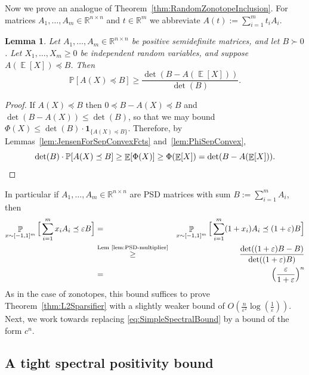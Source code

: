 \documentclass[12pt,english]{article}
\theoremstyle{theorem}
\newtheorem{lemma}[theorem]{Lemma}
\theoremstyle{remark}
\providecommand{\setR}{\mathbb{R}}
\newcommand{\E}{\mathop{\mathbb{E}}}
\renewcommand{\Pr}{\mathop{\mathbb{P}}}
\begin{document}
Now we prove an analogue of Theorem~\ref{thm:RandomZonotopeInclusion}.
For matrices  $A_1,\dots,A_m\in\mathbb R^{n\times n}$ and $t \in \setR^m$ we abbreviate $A(t) := \sum_{i=1}^m t_iA_i$.
\begin{lemma} \label{lem:PSD-multiplier}
Let $A_1,\dots,A_m\in\mathbb R^{n\times n}$ be positive semidefinite matrices,
and let $B\succ0$. 
Let $X_1,\dots,X_m\geq0$ be independent random variables, and suppose $A(\E[X])\preceq B$. Then
\[
        \mathbb{P}[A(X)\preceq B] \ge \frac{\det(B-A(\E[X]))}{\det(B)}.
\]
\end{lemma}
\begin{proof}
If $A(X)\preceq B$ then $0\preceq B-A(X)\preceq B$ and $\det(B-A(X))\leq\det(B)$, so that we may bound $\Phi(X) \le \det(B)\cdot \mathbf 1_{\{A(X)\preceq B\}}$. Therefore, by Lemmas~\ref{lem:JensenForSepConvexFcts} and~\ref{lem:PhiSepConvex},
\[
        \det(B)\cdot \mathbb P[A(X)\preceq B] \ge \E[\Phi(X)] \ge \Phi(\E[X]) = \det(B-A(\E[X])). \qedhere
\]
\end{proof}
In particular if $A_1,\ldots,A_m \in \setR^{n \times n}$ are PSD matrices with sum $B := \sum_{i=1}^m A_i$, then
\begin{eqnarray} 
  \Pr_{x \sim [-1,1]^m}\Big[ \sum_{i=1}^m x_iA_i \preceq \varepsilon B\Big] &=& \Pr_{x \sim [-1,1]^m}\Big[ \sum_{i=1}^m (1+x_i)A_i \preceq (1+\varepsilon) B\Big] \label{eq:SimpleSpectralBound} \\
                                                                            &\stackrel{\textrm{Lem~\ref{lem:PSD-multiplier}}}{\geq}& \frac{\det( (1+\varepsilon)B - B)}{\det( (1+\varepsilon) B)} \nonumber
  \\ &=& \Big(\frac{\varepsilon}{1+\varepsilon}\Big)^n \nonumber
\end{eqnarray}
As in the case of zonotopes, this bound suffices to prove Theorem~\ref{thm:L2Sparsifier} with a slightly weaker bound of $O(\frac{n}{\varepsilon^2} \log(\frac{1}{\varepsilon}))$. Next, we work towards replacing 
\eqref{eq:SimpleSpectralBound} by a bound of the form $c^n$.

\subsection{A tight spectral positivity bound}

\iffalse
\end{document}
